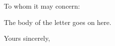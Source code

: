 \documentclass[11pt]{letter}
\makeatletter
\renewcommand{\closing}[1]{\par\nobreak\vspace{\parskip}%
 \stopbreaks
 \noindent
 \hspace*{\longindentation}
 \parbox{\indentedwidth}{\raggedright
 \ignorespaces #1\\[6\medskipamount]%
 \ifx\@empty\fromsig
 \fromname
 \else \fromsig \fi\strut}%
\par}
\makeatother
\begin{document}
\begin{letter}{}

\opening{To whom it may concern:}

The body of the letter goes on here. 

\closing{Yours sincerely,}

\end{letter}
\end{document}
